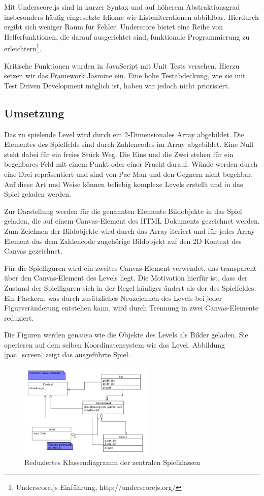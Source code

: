 \documentclass[conference]{IEEEtran}
\begin{document}
Mit Underscore.js sind in kurzer Syntax und auf höherem Abstraktionsgrad insbesonders häufig eingesetzte Idiome wie Listeniterationen abbildbar. Hierdurch ergibt sich weniger Raum für Fehler. Underscore bietet eine Reihe von Helferfunktionen, die darauf ausgerichtet sind, funktionale Programmierung zu erleichtern\footnote[1]{Underscore.js Einführung, http://underscorejs.org/}.

Kritische Funktionen wurden in JavaScript mit Unit Tests versehen. Hierzu setzen wir das Framework Jasmine ein. Eine hohe Testabdeckung, wie sie mit Test Driven Development möglich ist, haben wir jedoch nicht priorisiert.

\subsection{Umsetzung}
\label{umsetz}
Das zu spielende Level  wird durch ein 2-Dimensionales Array abgebildet. Die Elementes des Spielfelds sind durch Zahlencodes im Array abgebildet. Eine Null steht dabei für ein freies Stück Weg. Die Eins und die Zwei stehen für ein begehbares Feld mit einem Punkt oder einer Frucht darauf. Wände werden durch eine Drei repräsentiert und sind von Pac Man und den Gegnern nicht begehbar. Auf diese Art und Weise können beliebig komplexe Levels erstellt und in das Spiel geladen werden.

Zur Darstellung werden für die genannten Elemente Bildobjekte in das Spiel geladen, die auf einem Canvas-Element des HTML Dokuments gezeichnet werden. Zum Zeichnen der Bildobjekte wird durch das Array iteriert und für jedes Array-Element das dem Zahlencode zugehörige Bildobjekt auf den 2D Kontext des Canvas gezeichnet.

Für die Spielfiguren wird ein zweites Canvas-Element verwendet, das transparent über den Canvas-Element des Levels liegt. Die Motivation hierfür ist, dass der Zustand der Spielfiguren sich in der Regel häufiger ändert als der des Spielfeldes. Ein Flackern, was durch zusätzliches Neuzeichnen des Levels bei jeder Figurveränderung entstehen kann, wird durch Trennung in zwei Canvas-Elemente reduziert.

Die Figuren werden  genauso wie die Objekte des Levels als Bilder geladen. Sie operieren auf dem selben Koordinatensystem wie das Level. Abbildung \ref{pac_screen} zeigt das ausgeführte Spiel.

\begin{figure}[!t]
\centering
\includegraphics[width=2.5in]{gameboard_and_figures.png}

\caption{Reduziertes Klassendiagramm der zentralen Spielklassen}
\label{main_classes}
\end{figure}
\end{document}
